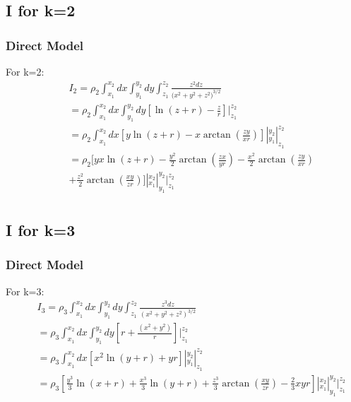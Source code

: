 \documentclass{beamer}
\begin{document}
\subsection{I for k=2} %

\begin{frame}
\frametitle{Direct Model}
For k=2:
 \begin{eqnarray}
&&I_2 =  \rho_2 \int_{x_1}^{x_2}dx \int_{y_1}^{y_2} dy \int_{z_1}^{z_2} \frac{z^2 dz} {({x^2 + y^2 + z^2)} ^{3/2}} \nonumber \\   
&&= \rho_2 \int_{x_1}^{x_2}dx \int_{y_1}^{y_2} dy \left[ {\ln {(z+r)} - \frac{z}{r}}  \right]  |_{z_1}^{z_2} \nonumber \\  
&&= \rho_2 \int_{x_1}^{x_2}dx \left[ {y\ln {(z+r)} - x\arctan{\left(\frac{zy}{xr}\right)}}  \right]|_{y_1}^{y_2}|_{z_1}^{z_2} \nonumber \\
&&= \rho_2 [ yx\ln{(z+r)}-\frac{y^2}{2}\arctan{\left(\frac{zx}{yr}\right)} - \frac{x^2}{2}\arctan{\left(\frac{zy}{xr}\right)} \nonumber \\  
&&+ \frac{z^2}{2}\arctan{\left(\frac{xy}{zr}\right)} ]|_{x_1}^{x_2}|_{y_1}^{y_2}|_{z_1}^{z_2} \nonumber \\
 \label{i11}
\end{eqnarray}
\end{frame}
\subsection{I for k=3} %

\begin{frame}
\frametitle{Direct Model}
For k=3:
 \begin{eqnarray}
&&I_3 =  \rho_3 \int_{x_1}^{x_2}dx \int_{y_1}^{y_2} dy \int_{z_1}^{z_2} \frac{z^3 dz} {{(x^2 + y^2 + z^2)} ^{3/2}} \nonumber \\ 
&&= \rho_3 \int_{x_1}^{x_2}dx \int_{y_1}^{y_2} dy \left[ {r + \frac{(x^2+y^2)}{r}}  \right]  |_{z_1}^{z_2} \nonumber \\  
&&= \rho_3 \int_{x_1}^{x_2}dx \left[ {x^2\ln {(y+r)} + yr}  \right]|_{y_1}^{y_2}|_{z_1}^{z_2} \nonumber \\
&&= \rho_3 \left[ \frac{y^3}{3}\ln{(x+r)}+\frac{x^3}{3}\ln{(y+r)}+\frac{z^3}{3}\arctan{\left(\frac{xy}{zr}\right)}-\frac{2}{3} xyr \right]|_{x_1}^{x_2}|_{y_1}^{y_2}|_{z_1}^{z_2} \nonumber \\
 \label{i12}
 \end{eqnarray}
\end{frame}
\end{document}
